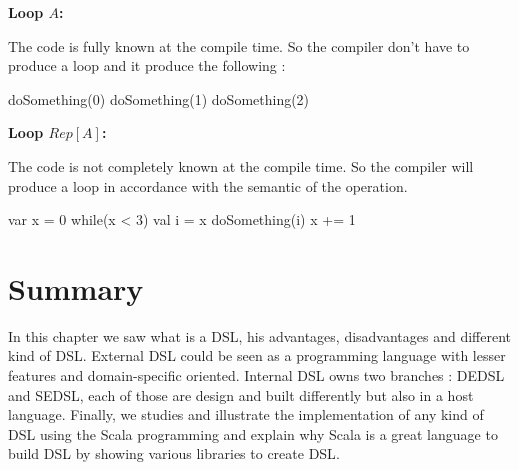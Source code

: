 \textbf{Loop $A$:}

The code  is fully known at the compile time. So
the compiler don't have to produce a loop and it produce the following :
\begin{scalacode}
doSomething(0)
doSomething(1)
doSomething(2)
\end{scalacode}

\textbf{Loop $Rep[A]$:}

The code  is not completely known at
the compile time. So the compiler will produce a loop in accordance with the
semantic of the operation.
\begin{scalacode}
var x = 0
while(x < 3) {
  val i = x
	doSomething(i)
	x += 1
}
\end{scalacode}

\section{Summary}
\label{sec:dsl_summary}

In this chapter we saw what is a \gls{DSL}, his advantages, disadvantages and
different kind of \gls{DSL}. External \gls{DSL} could be seen as a programming
language with lesser features and domain-specific oriented. Internal \gls{DSL}
owns two branches : \gls{DEDSL} and \gls{SEDSL}, each of those are design and
built differently but also in a host language. Finally, we studies and
illustrate the implementation of any kind of \gls{DSL} using the Scala
programming and explain why Scala is a great language to build \gls{DSL} by
showing various libraries to create \gls{DSL}.

